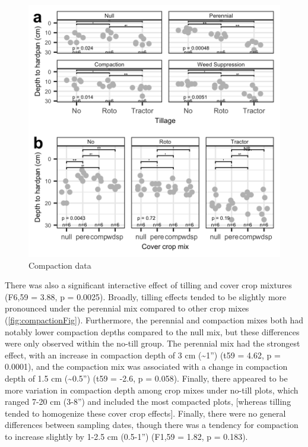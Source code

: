 \documentclass[
]{article}
\begin{document}
\begin{figure}
\includegraphics[width=12.5in]{../figs/compactionPlot} \caption{Compaction data}\label{fig:compactFig}
\end{figure}

There was also a significant interactive effect of tilling and cover crop mixtures (F6,59 = 3.88, p = 0.0025).
Broadly, tilling effects tended to be slightly more pronounced under the perennial mix compared to other crop mixes (\ref{fig:compactionFig}).
Furthermore, the perennial and compaction mixes both had notably lower compaction depths compared to the null mix, but these differences were only observed within the no-till group.
The perennial mix had the strongest effect, with an increase in compaction depth of 3 cm (\textasciitilde1'') (t59 = 4.62, p = 0.0001), and the compaction mix was associated with a change in compaction depth of 1.5 cm (\textasciitilde0.5'') (t59 = -2.6, p = 0.058).
Finally, there appeared to be more variation in compaction depth among crop mixes under no-till plots, which ranged 7-20 cm (3-8'') and included the most compacted plots, {[}whereas tilling tended to homogenize these cover crop effects{]}.
Finally, there were no general differences between sampling dates, though there was a tendency for compaction to increase slightly by 1-2.5 cm (0.5-1'') (F1,59 = 1.82, p = 0.183).
\end{document}

